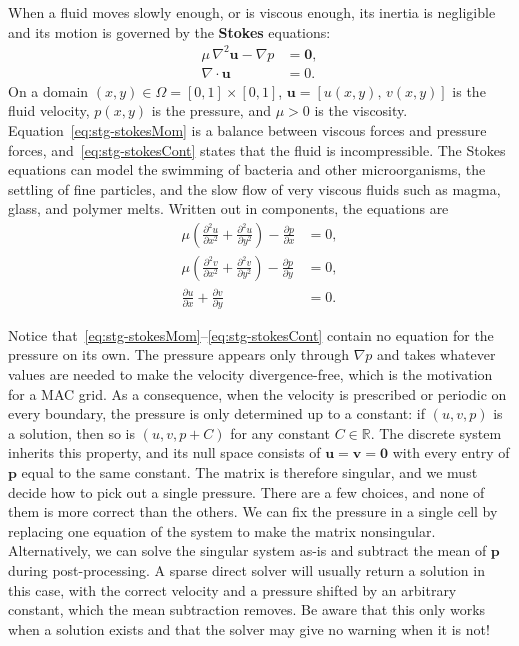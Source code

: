 When a fluid moves slowly enough, or is viscous enough, its inertia is negligible and its motion is governed by the \textbf{Stokes} equations:
\begin{align}
    \mu\,\nabla^2\mathbf{u} - \nabla p &= \mathbf{0}, \label{eq:stg-stokesMom}\\
    \nabla\cdot\mathbf{u} &= 0. \label{eq:stg-stokesCont}
\end{align}
On a domain $(x,y)\in\Omega = [0,1]\times[0,1]$, $\mathbf{u} = [u(x,y),\,v(x,y)]$ is the fluid velocity, $p(x,y)$ is the pressure, and $\mu>0$ is the viscosity. Equation~\eqref{eq:stg-stokesMom} is a balance between viscous forces and pressure forces, and~\eqref{eq:stg-stokesCont} states that the fluid is incompressible. The Stokes equations can model the swimming of bacteria and other microorganisms, the settling of fine particles, and the slow flow of very viscous fluids such as magma, glass, and polymer melts. Written out in components, the equations are
\begin{align}
    \mu\left(\frac{\partial^2 u}{\partial x^2} + \frac{\partial^2 u}{\partial y^2}\right) - \frac{\partial p}{\partial x} &= 0, \label{eq:stg-xmom}\\
    \mu\left(\frac{\partial^2 v}{\partial x^2} + \frac{\partial^2 v}{\partial y^2}\right) - \frac{\partial p}{\partial y} &= 0, \label{eq:stg-ymom}\\
    \frac{\partial u}{\partial x} + \frac{\partial v}{\partial y} &= 0. \label{eq:stg-cont}
\end{align}

Notice that~\eqref{eq:stg-stokesMom}--\eqref{eq:stg-stokesCont} contain no equation for the pressure on its own. The pressure appears only through $\nabla p$ and takes whatever values are needed to make the velocity divergence-free, which is the motivation for a MAC grid. As a consequence, when the velocity is prescribed or periodic on every boundary, the pressure is only determined up to a constant: if $(u, v, p)$ is a solution, then so is $(u, v, p + C)$ for any constant $C \in \mathbb{R}$. The discrete system inherits this property, and its null space consists of $\mathbf{u} = \mathbf{v} = \mathbf{0}$ with every entry of $\mathbf{p}$ equal to the same constant. The matrix is therefore singular, and we must decide how to pick out a single pressure. There are a few choices, and none of them is more correct than the others. We can fix the pressure in a single cell by replacing one equation of the system to make the matrix nonsingular. Alternatively, we can solve the singular system as-is and subtract the mean of $\mathbf{p}$ during post-processing. A sparse direct solver will usually return a solution in this case, with the correct velocity and a pressure shifted by an arbitrary constant, which the mean subtraction removes. Be aware that this only works when a solution exists and that the solver may give no warning when it is not!


